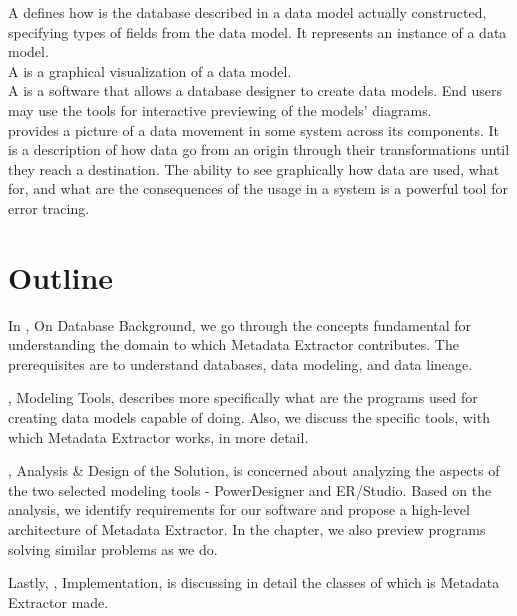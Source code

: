 A  defines how is the database described in a data model actually constructed, specifying types of fields from the data model. It represents an instance of a data model. \\

A  is a graphical visualization of a data model. \\

A  is a software that allows a database designer to create data models. End users may use the tools for interactive previewing of the models' diagrams. \\

 provides a picture of a data movement in some system across its components. It is a description of how data go from an origin through their transformations until they reach a destination. 
The ability to see graphically how data are used, what for, and what are the consequences of the usage in a system is a powerful tool for error tracing. \\

\section{Outline}

In , On Database Background, we go through the concepts fundamental for understanding the domain to which Metadata Extractor contributes. The prerequisites are to understand databases, data modeling, and data lineage.

, Modeling Tools, describes more specifically what are the programs used for creating data models capable of doing.
Also, we discuss the specific tools, with which Metadata Extractor works, in more detail.

, Analysis \& Design of the Solution, is concerned about analyzing the aspects of the two selected modeling tools - PowerDesigner and ER/Studio. 
Based on the analysis, we identify requirements for our software and propose a high-level architecture of Metadata Extractor.
In the chapter, we also preview programs solving similar problems as we do.

Lastly, , Implementation, is discussing in detail the classes of which is Metadata Extractor made.


